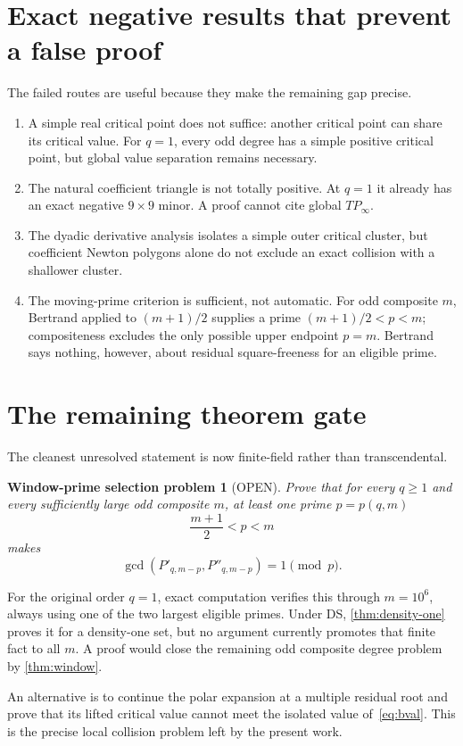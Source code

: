 \documentclass[11pt]{article}
\theoremstyle{keio}
\theoremstyle{keioinput}
\newtheorem*{problem}{Window-prime selection problem}
\newcommand{\OPEN}{\textcolor{openred}{\textsf{OPEN}}}
\begin{document}
\section{Exact negative results that prevent a false proof}

The failed routes are useful because they make the remaining gap precise.
\begin{enumerate}
\item A simple real critical point does not suffice: another critical point
can share its critical value. For $q=1$, every odd degree has a simple
positive critical point, but global value separation remains necessary.
\item The natural coefficient triangle is not totally positive. At $q=1$
it already has an exact negative $9\times9$ minor. A proof cannot cite global
$TP_\infty$.
\item The dyadic derivative analysis isolates a simple outer critical
cluster, but coefficient Newton polygons alone do not exclude an exact
collision with a shallower cluster.
\item The moving-prime criterion is sufficient, not automatic. For odd
composite $m$, Bertrand applied to $(m+1)/2$ supplies a prime
$(m+1)/2<p<m$; compositeness excludes the only possible upper endpoint
$p=m$. Bertrand says nothing, however, about residual square-freeness for
an eligible prime.
\end{enumerate}

\section{The remaining theorem gate}

The cleanest unresolved statement is now finite-field rather than
transcendental.

\begin{problem}[\OPEN]
Prove that for every $q\ge1$ and every sufficiently large odd composite $m$,
at least one prime $p=p(q,m)$
\[
\frac{m+1}{2}<p<m
\]
makes
\[
\gcd(P'_{q,m-p},P''_{q,m-p})=1\pmod p.
\]
\end{problem}

For the original order $q=1$, exact computation verifies this through
$m=10^6$, always using one of the two largest eligible primes. Under DS,
\cref{thm:density-one} proves it for a density-one set, but no argument
currently promotes that finite fact to all $m$. A proof would close the
remaining odd composite degree problem by \cref{thm:window}.

An alternative is to continue the polar expansion at a multiple residual
root and prove that its lifted critical value cannot meet the isolated value
of~\eqref{eq:bval}. This is the precise local collision problem left by the
present work.
\end{document}
